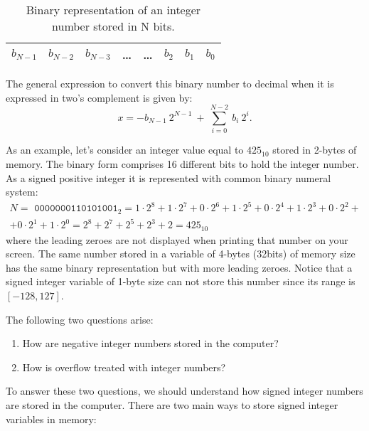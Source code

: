 \begin{table}[h]
    \centering
    \begin{tabular}{| c | c | c | c | c | c | c | c |}
        \hline
        $ b_{N-1} $  & $ b_{N-2} $ &  $ b_{N-3} $ &\ldots  & \ldots & $ b_{2} $  & $ b_{1} $ & $ b_{0} $ \\ \hline 
    \end{tabular}                                                       
    \caption{Binary representation of an integer number stored in N bits.}
    \label{bits}
\end{table}

The general expression to convert this binary number to decimal when it is expressed in two's complement is given by: 
\begin{equation} 
 x = - b_{N-1} \ 2 ^{ N-1 } \ + \ \sum_{i=0} ^{ N-2} \ b_i \ 2^i. 
 \label{reconstruction}
\end{equation} 

As an example, let's consider an integer value equal to $425_{10}$ stored in 2-bytes of memory.
The binary form comprises 16 different bits to hold the integer number. As a signed positive integer 
it is represented with common binary numeral system: 
\begin{multline*}
    N = \texttt{ 0000000110101001}_{2} = 1\cdot 2^8 +1\cdot 2^7+ 0\cdot 2^6+ 1\cdot 2^5+ 0\cdot 2^4+ 1\cdot 2^3+  0\cdot 2^2+ \\ + 0\cdot 2^1+ 1\cdot 
    2^0 = 2^8 + 2^7 + 2^5 + 2^3 + 2 = 425_{10}
\end{multline*}
where the leading zeroes are not displayed when printing that number on your screen. 
The same number stored in a variable of 4-bytes (32bits) of memory size
has the same binary representation but with more leading zeroes. 
Notice that a signed integer variable of 1-byte size can not store this number 
since its range is  $[-128, 127]$. 




The following two questions arise:
\begin{enumerate} 
\setlength\itemsep{0cm}
\item How are negative integer numbers stored in the computer? 
\item How is overflow treated with integer numbers? 
\end{enumerate} 

To answer these two questions, we should understand how signed integer  
numbers are stored in the computer. 
There are two main ways to store signed integer variables in memory: 

